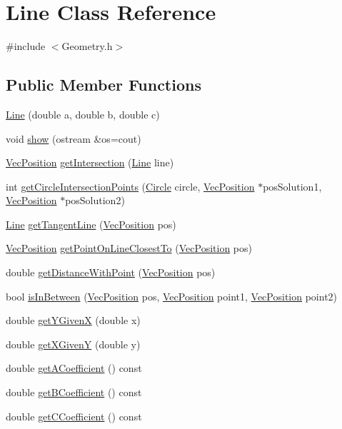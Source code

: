 \hypertarget{classLine}{}\section{Line Class Reference}
\label{classLine}


{\ttfamily \#include $<$Geometry.\+h$>$}

\subsection*{Public Member Functions}
\begin{DoxyCompactItemize}
\item 
\hyperlink{classLine_aba5e77c92e5e6932e90d0c083e6509e5}{Line} (double a, double b, double c)
\item 
void \hyperlink{classLine_a77a64cd9dbaae4028d7b3a54a8b564c2}{show} (ostream \&os=cout)
\item 
\hyperlink{classVecPosition}{Vec\+Position} \hyperlink{classLine_a5085539a0be85d173b45067c31f97ef3}{get\+Intersection} (\hyperlink{classLine}{Line} line)
\item 
int \hyperlink{classLine_adef17433b57a158f8974044b3167aff2}{get\+Circle\+Intersection\+Points} (\hyperlink{classCircle}{Circle} circle, \hyperlink{classVecPosition}{Vec\+Position} $\ast$pos\+Solution1, \hyperlink{classVecPosition}{Vec\+Position} $\ast$pos\+Solution2)
\item 
\hyperlink{classLine}{Line} \hyperlink{classLine_a7b8654888fcc843c42484c0a6571b88a}{get\+Tangent\+Line} (\hyperlink{classVecPosition}{Vec\+Position} pos)
\item 
\hyperlink{classVecPosition}{Vec\+Position} \hyperlink{classLine_a8c63b6e7ce667178cbccdac5637df7bc}{get\+Point\+On\+Line\+Closest\+To} (\hyperlink{classVecPosition}{Vec\+Position} pos)
\item 
double \hyperlink{classLine_ae0ba5505724099aca7549429330f676b}{get\+Distance\+With\+Point} (\hyperlink{classVecPosition}{Vec\+Position} pos)
\item 
bool \hyperlink{classLine_a4b0e81c2871ab03519a6aa8ce122db65}{is\+In\+Between} (\hyperlink{classVecPosition}{Vec\+Position} pos, \hyperlink{classVecPosition}{Vec\+Position} point1, \hyperlink{classVecPosition}{Vec\+Position} point2)
\item 
double \hyperlink{classLine_a744eda0c526309a3a4e5b956e3ea3403}{get\+Y\+GivenX} (double x)
\item 
double \hyperlink{classLine_ab3e765f1fd933ed5a9e0a93481ccbaa9}{get\+X\+GivenY} (double y)
\item 
double \hyperlink{classLine_a484d7b589b86c005f8c9b7d648f14ddc}{get\+A\+Coefficient} () const 
\item 
double \hyperlink{classLine_af0e643b426fca9f949cdb21a259e0a43}{get\+B\+Coefficient} () const 
\item 
double \hyperlink{classLine_a6b767735ff2d4e535f02428b3a543d9c}{get\+C\+Coefficient} () const 
\end{DoxyCompactItemize}
